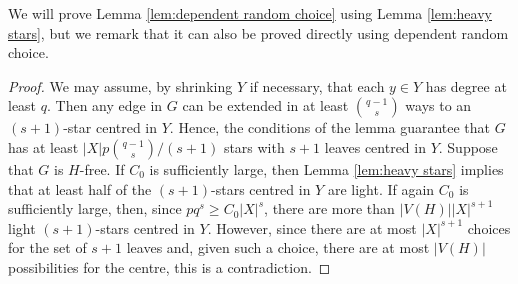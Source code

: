 \documentclass[11pt]{article}
\numberwithin{equation}{section}
\theoremstyle{definition}
\begin{document}
We will prove Lemma \ref{lem:dependent random choice} using Lemma \ref{lem:heavy stars}, but we remark that it can also be proved directly using dependent random choice.

\begin{proof}
    We may assume, by shrinking $Y$ if necessary, that each $y\in Y$ has degree at least $q$. Then any edge in $G$ can be extended in at least $\binom{q-1}{s}$ ways to an $(s+1)$-star centred in $Y$. Hence, the conditions of the lemma guarantee that $G$ has at least $|X|p\binom{q-1}{s}/(s+1)$ stars with $s+1$ leaves centred in $Y$. Suppose that $G$ is $H$-free. If $C_0$ is sufficiently large, then Lemma \ref{lem:heavy stars} implies that at least half of the $(s+1)$-stars centred in $Y$ are light. If again $C_0$ is sufficiently large, then, since $pq^s\geq C_0|X|^s$, there are more than $|V(H)||X|^{s+1}$ light $(s+1)$-stars centred in $Y$. However, since there are at most $|X|^{s+1}$ choices for the set of $s+1$ leaves and, given such a choice, there are at most $|V(H)|$ possibilities for the centre, this is a contradiction.
\end{proof}

\end{document}
